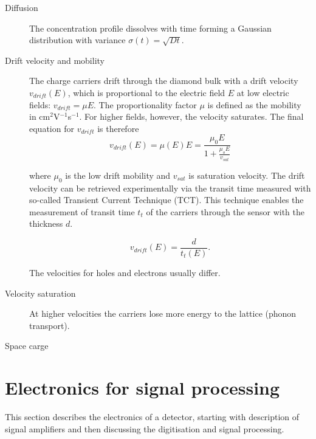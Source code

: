 \documentclass[11pt]{mytustyle}  %
\begin{document}
\begin{description}

\item[Diffusion]
The concentration profile dissolves with time forming a Gaussian distribution with variance $\sigma(t)=\sqrt{Dt}$. 

\item[Drift velocity and mobility]
The charge carriers drift through the diamond bulk with a drift velocity $v_{drift}(E)$, which is proportional to the electric field $E$ at low electric fields: $v_{drift} = \mu E$. The proportionality factor $\mu$ is defined as the mobility in cm$^2$V$^{-1}$s$^{-1}$. For higher fields, however, the velocity saturates. The final equation for $v_{drift}$ is therefore
\begin{equation}
\label{eq:vsat}
v_{drift}(E) = \mu(E)E= \frac{\mu_0 E}{1 + \frac{\mu_o E}{v_{sat}}}
\end{equation}

where $\mu_0$ is the low drift mobility and $v_{sat}$ is saturation velocity. The drift velocity can be retrieved experimentally via the transit time measured with so-called Transient Current Technique (TCT). This technique enables the measurement of transit time $t_t$ of the carriers through the sensor with the thickness $d$. 

\begin{equation}
\label{eq:vsat}
v_{drift}(E) = \frac{d}{t_t(E)}.
\end{equation}

The velocities for holes and electrons usually differ. 

\item[Velocity saturation]
At higher velocities the carriers lose more energy to the lattice (phonon transport).

\item[Space carge]


\end{description}













\clearpage
\section{Electronics for signal processing} %
\label{sec:elecsigproc}
This section describes the electronics of a detector, starting with description of signal amplifiers and then discussing the digitisation and signal processing.
\end{document}
